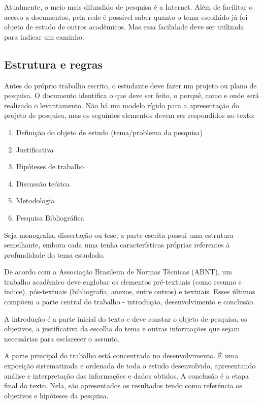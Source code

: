 Atualmente, o meio mais difundido de pesquisa é a Internet. Além de facilitar o acesso a documentos, pela rede é possível saber quanto o tema escolhido já foi objeto de estudo de outros acadêmicos. Mas essa facilidade deve ser utilizada para indicar um caminho.

\subsection{Estrutura e regras}
Antes do próprio trabalho escrito, o estudante deve fazer um projeto ou plano de pesquisa. O documento identifica o que deve ser feito, o porquê, como e onde será realizado o levantamento. Não há um modelo rígido para a apresentação do projeto de pesquisa, mas os seguintes elementos devem ser respondidos no texto:

\begin{enumerate}
  \item Definição do objeto de estudo (tema/problema da pesquisa)
  \item Justificativa
  \item Hipóteses de trabalho
  \item Discussão teórica
  \item Metodologia
  \item Pesquisa Bibliográfica
\end{enumerate}

Seja monografia, dissertação ou tese, a parte escrita possui uma estrutura semelhante, embora cada uma tenha características próprias referentes à profundidade do tema estudado.

De acordo com a Associação Brasileira de Normas Técnicas (ABNT), um trabalho acadêmico deve englobar os elementos pré-textuais (como resumo e índice), pós-textuais (bibliografia, anexos, entre outros) e textuais. Esses últimos compõem a parte central do trabalho - introdução, desenvolvimento e conclusão.

A introdução é a parte inicial do texto e deve constar o objeto de pesquisa, os objetivos, a justificativa da escolha do tema e outras informações que sejam necessárias para esclarecer o assunto.

A parte principal do trabalho está concentrada no desenvolvimento. É uma exposição sistematizada e ordenada de toda o estudo desenvolvido, apresentando análise e interpretação das informações e dados obtidos. A conclusão é a etapa final do texto. Nela, são apresentados os resultados tendo como referência os objetivos e hipóteses da pesquisa.

